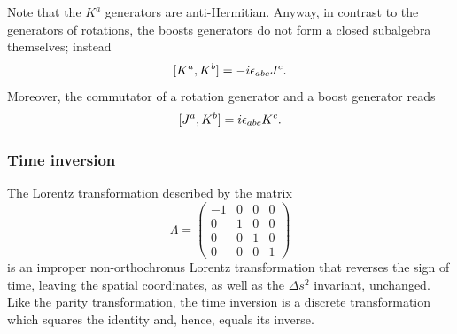 Note that the $K^a$ generators are anti-Hermitian. Anyway, in contrast to the generators of rotations, the boosts generators do not form a closed subalgebra themselves; instead
\begin{equation}
\label{eq: commutator between K and K}
    [K^a,K^b] = -i\epsilon_{abc}J^c.
\end{equation}
Moreover, the commutator of a rotation generator and a boost generator reads
\begin{equation}
\label{eq: commutator between J and K}
    [J^a,K^b] = i\epsilon_{abc}K^c.
\end{equation}

\subsubsection{Time inversion}
The Lorentz transformation described by the matrix 
\begin{equation}
    \Lambda = 
    \begin{pmatrix}
        -1 & 0 & 0 & 0 \\
        0 & 1 & 0 & 0 \\
        0 & 0 & 1 & 0 \\
        0 & 0 & 0 & 1
    \end{pmatrix}
\end{equation}
is an improper non-orthochronus Lorentz transformation that reverses the sign of time, leaving the spatial coordinates, as well as the $\Delta s^2$ invariant, unchanged. Like the parity transformation, the time inversion is a discrete transformation which squares the identity and, hence, equals its inverse.

